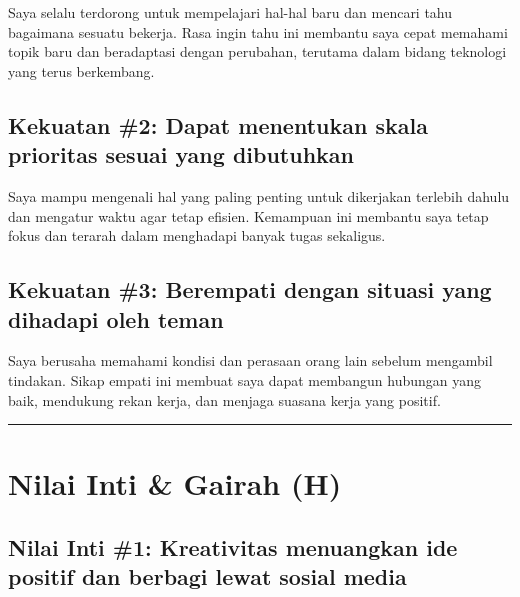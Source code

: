 \documentclass[
  letterpaper,
  DIV=11,
  numbers=noendperiod]{scrreprt}
\begin{document}
Saya selalu terdorong untuk mempelajari hal-hal baru dan mencari tahu
bagaimana sesuatu bekerja. Rasa ingin tahu ini membantu saya cepat
memahami topik baru dan beradaptasi dengan perubahan, terutama dalam
bidang teknologi yang terus berkembang.

\subsection*{Kekuatan \#2: Dapat menentukan skala prioritas sesuai yang
dibutuhkan}\label{kekuatan-2-dapat-menentukan-skala-prioritas-sesuai-yang-dibutuhkan}

Saya mampu mengenali hal yang paling penting untuk dikerjakan terlebih
dahulu dan mengatur waktu agar tetap efisien. Kemampuan ini membantu
saya tetap fokus dan terarah dalam menghadapi banyak tugas sekaligus.

\subsection*{Kekuatan \#3: Berempati dengan situasi yang dihadapi oleh
teman}\label{kekuatan-3-berempati-dengan-situasi-yang-dihadapi-oleh-teman}

Saya berusaha memahami kondisi dan perasaan orang lain sebelum mengambil
tindakan. Sikap empati ini membuat saya dapat membangun hubungan yang
baik, mendukung rekan kerja, dan menjaga suasana kerja yang positif.

\begin{center}\rule{0.5\linewidth}{0.5pt}\end{center}

\section{Nilai Inti \& Gairah (H)}\label{nilai-inti-gairah-h}

\subsection*{Nilai Inti \#1: Kreativitas menuangkan ide positif dan
berbagi lewat sosial
media}\label{nilai-inti-1-kreativitas-menuangkan-ide-positif-dan-berbagi-lewat-sosial-media}
\end{document}
